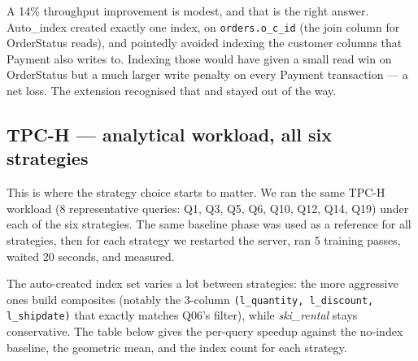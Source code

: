 \documentclass[10pt,a4paper]{article}
\newcommand{\code}[1]{\texttt{\small #1}}
\begin{document}
A 14\% throughput improvement is modest, and that is the right
answer. Auto\_index created exactly one index, on \code{orders.o\_c\_id}
(the join column for OrderStatus reads), and pointedly avoided
indexing the customer columns that Payment also writes to. Indexing
those would have given a small read win on OrderStatus but a much
larger write penalty on every Payment transaction --- a net loss.
The extension recognised that and stayed out of the way.

\subsection*{TPC-H --- analytical workload, all six strategies}

This is where the strategy choice starts to matter. We ran the same
TPC-H workload (8 representative queries: Q1, Q3, Q5, Q6, Q10, Q12,
Q14, Q19) under each of the six strategies. The same baseline phase
was used as a reference for all strategies, then for each strategy
we restarted the server, ran 5 training passes, waited 20 seconds,
and measured.

The auto-created index set varies a lot between strategies: the more
aggressive ones build composites (notably the 3-column
\code{(l\_quantity, l\_discount, l\_shipdate)} that exactly matches
Q06's filter), while \emph{ski\_rental} stays conservative. The
table below gives the per-query speedup against the no-index
baseline, the geometric mean, and the index count for each
strategy.
\end{document}
